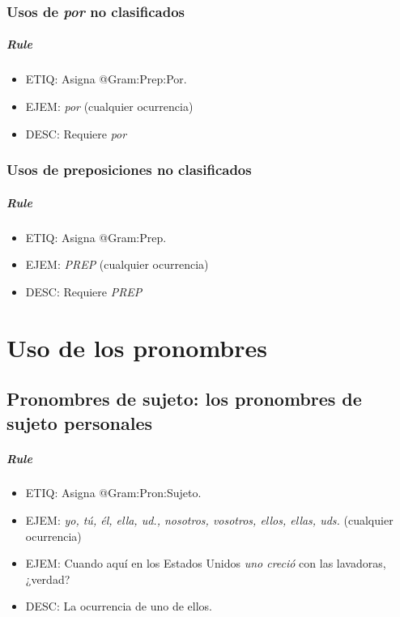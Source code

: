 \documentclass[11pt]{report}
\begin{document}
\subsection{Usos de \emph{por} no clasificados}
\paragraph*{Rule}
\begin{itemize}
\item ETIQ: Asigna @Gram:Prep:Por.
\item EJEM: \emph{por} (cualquier ocurrencia)
\item DESC: Requiere \emph{por}
\end{itemize}

\subsection{Usos de preposiciones no clasificados}
\paragraph*{Rule}
\begin{itemize}
\item ETIQ: Asigna @Gram:Prep.
\item EJEM: \emph{PREP} (cualquier ocurrencia)
\item DESC: Requiere \emph{PREP}
\end{itemize}

\chapter{Uso de los pronombres}
\section{Pronombres de sujeto: los pronombres de sujeto personales}
\paragraph*{Rule}
\begin{itemize}
\item ETIQ: Asigna @Gram:Pron:Sujeto.
\item EJEM: \emph{yo, tú, él, ella, ud., nosotros, vosotros, ellos, ellas, uds.} (cualquier ocurrencia)
\item EJEM: Cuando aquí en los Estados Unidos \emph{uno creció} con las lavadoras, ¿verdad? 
\item DESC: La ocurrencia de uno de ellos.
\end{itemize}
\end{document}

